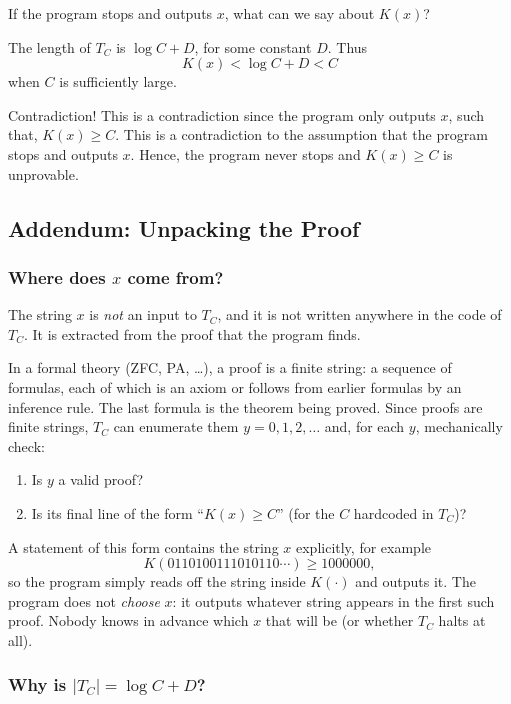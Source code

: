 \documentclass{article}
\begin{document}
If the program stops and outputs $x$, what can we say about $K(x)$?

The length of $T_C$ is $\log C + D$, for some constant $D$. Thus 
\[
K(x) < \log C + D < C
\]
when $C$ is sufficiently large.

Contradiction! This is a contradiction since the program only outputs $x$, such that, $K(x)\geq C$. This is a contradiction to the assumption that the program stops and outputs $x$. Hence, the program never stops and $K(x)\geq C$ is unprovable.

\subsection{Addendum: Unpacking the Proof}

\subsubsection{Where does $x$ come from?}

The string $x$ is \emph{not} an input to $T_C$, and it is not written anywhere in the code of $T_C$. It is extracted from the proof that the program finds.

In a formal theory (ZFC, PA, \ldots), a proof is a finite string: a sequence of formulas, each of which is an axiom or follows from earlier formulas by an inference rule. The last formula is the theorem being proved. Since proofs are finite strings, $T_C$ can enumerate them $y = 0, 1, 2, \ldots$ and, for each $y$, mechanically check:
\begin{enumerate}
    \item Is $y$ a valid proof?
    \item Is its final line of the form ``$K(x)\geq C$'' (for the $C$ hardcoded in $T_C$)?
\end{enumerate}
A statement of this form contains the string $x$ explicitly, for example
\[
K(0110100111010110\cdots)\geq 1000000,
\]
so the program simply reads off the string inside $K(\cdot)$ and outputs it. The program does not \emph{choose} $x$: it outputs whatever string appears in the first such proof. Nobody knows in advance which $x$ that will be (or whether $T_C$ halts at all).

\subsubsection{Why is $|T_C| = \log C + D$?}
\end{document}
